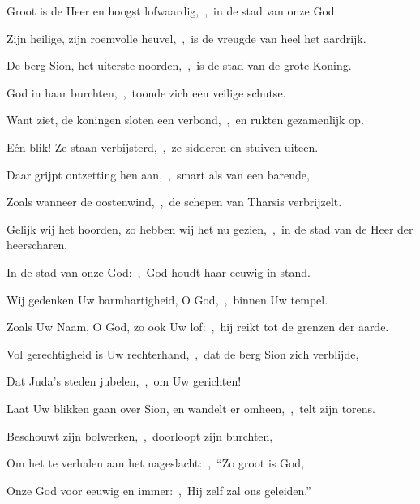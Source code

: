 \documentclass[12pt,twoside,a5paper]{article}
\begin{document}
\begin{halfparskip}
  Groot is de Heer en hoogst lofwaardig,~\sep\ in de stad van onze God.


  Zijn heilige, zijn roemvolle heuvel,~\sep\ is de vreugde van heel het aardrijk.

  De berg Sion, het uiterste noorden,~\sep\ is de stad van de grote Koning.

  God in haar burchten,~\sep\ toonde zich een veilige schutse.

  Want ziet, de koningen sloten een verbond,~\sep\ en rukten gezamenlijk op.

  Eén blik! Ze staan verbijsterd,~\sep\ ze sidderen en stuiven uiteen.

  Daar grijpt ontzetting hen aan,~\sep\ smart als van een barende,

  Zoals wanneer de oostenwind,~\sep\ de schepen van Tharsis verbrijzelt.
\end{halfparskip}


\begin{halfparskip}
  Gelijk wij het hoorden, zo hebben wij het nu gezien,~\sep\ in de stad van de Heer der heerscharen,

  In de stad van onze God:~\sep\ God houdt haar eeuwig in stand.

  Wij gedenken Uw barmhartigheid, O God,~\sep\ binnen Uw tempel.

  Zoals Uw Naam, O God, zo ook Uw lof:~\sep\ hij reikt tot de grenzen der aarde.

  Vol gerechtigheid is Uw rechterhand,~\sep\ dat de berg Sion zich verblijde,

  Dat Juda's steden jubelen,~\sep\ om Uw gerichten!

  Laat Uw blikken gaan over Sion, en wandelt er omheen,~\sep\ telt zijn torens.

  Beschouwt zijn bolwerken,~\sep\ doorloopt zijn burchten,

  Om het te verhalen aan het nageslacht:~\sep\ ``Zo groot is God,

  Onze God voor eeuwig en immer:~\sep\ Hij zelf zal ons geleiden.''
\end{halfparskip}

\end{document}
